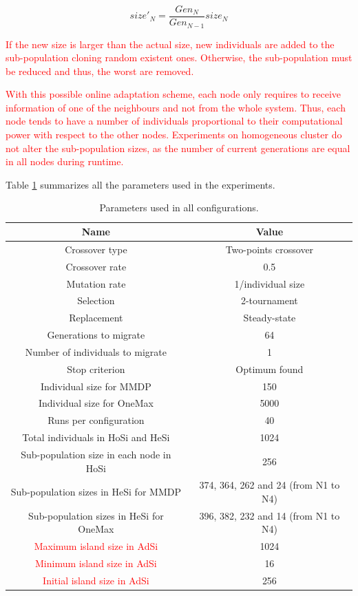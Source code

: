\documentclass[final,1p,times]{elsarticle}
\begin{document}
\begin{equation}
size'_{N}=\dfrac{Gen_{N}}{Gen_{N-1}}size_{N}
\end{equation}

\textcolor{red}{If the new size is larger than the actual size, new individuals are added to the sub-population cloning random existent ones. Otherwise, the sub-population must be reduced and thus, the worst are removed.}

\textcolor{red}{With this possible online adaptation scheme, each node only requires to receive information of one of the neighbours and not from the whole system. Thus, each node tends to have a number of individuals proportional to their computational power with respect to the other nodes. Experiments on homogeneous cluster do not alter the sub-population sizes, as the number of current generations are equal in all nodes during runtime.}

Table \ref{table:parameters} summarizes all the parameters used in the experiments.

\begin{table}
\centering
\caption{Parameters used in all configurations.}
\begin{tabular}{|c|c|} \hline
Name & Value\\ \hline

Crossover type & Two-points crossover \\ \hline
Crossover rate & 0.5\\ \hline
Mutation rate & 1/individual size\\ \hline
Selection & 2-tournament \\ \hline
Replacement & Steady-state\\ \hline
Generations to migrate & 64 \\ \hline
Number of individuals to migrate & 1 \\ \hline
Stop criterion & Optimum found \\ \hline
Individual size for MMDP & 150 \\ \hline
Individual size for OneMax & 5000 \\ \hline
Runs per configuration & 40 \\ \hline
\hline
Total individuals in HoSi and HeSi & 1024\\ \hline \hline
Sub-population size in each node in HoSi & 256  \\ \hline
Sub-population sizes in HeSi for MMDP & 374, 364, 262 and 24 (from N1 to N4)\\ \hline
Sub-population sizes in HeSi for OneMax & 396,  382, 232 and 14 (from N1 to N4)\\ \hline
\hline
\textcolor{red}{Maximum island size in AdSi} & 1024 \\ \hline
\textcolor{red}{Minimum island size in AdSi} & 16 \\ \hline
\textcolor{red}{Initial island size in AdSi} & 256 \\ \hline 
\end{tabular}
\label{table:parameters}
\end{table}
\end{document}
